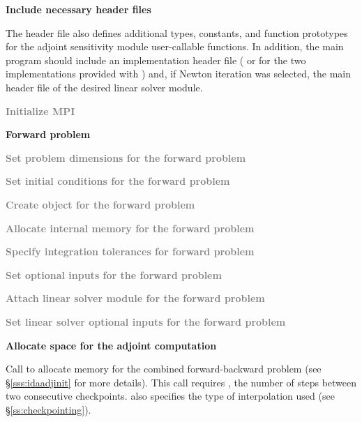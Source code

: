 \begin{Steps}

\item
  {\bf Include necessary header files}
  
  The  header file also defines additional types, constants, and
  function prototypes for the adjoint sensitivity module user-callable functions.
  In addition, the main program should include an {\nvector} 
  implementation header file ( or 
  for the two implementations provided with {\idas}) and, if Newton iteration 
  was selected, the main header file of the desired linear solver module.

\item
  \textcolor{gray}{\bf {\p} Initialize MPI}

  \vspace{0.2in}\centerline{\bf Forward problem}

\item
  \textcolor{gray}{\bf Set problem dimensions for the forward problem}

\item
  \textcolor{gray}{\bf Set initial conditions for the forward problem}

\item
  \textcolor{gray}{\bf Create {\idas} object for the forward problem}

\item
  \textcolor{gray}{\bf Allocate internal memory for the forward problem}

\item
  \textcolor{gray}{\bf Specify integration tolerances for forward problem}

\item
  \textcolor{gray}{\bf Set optional inputs for the forward problem}

\item
  \textcolor{gray}{\bf Attach linear solver module for the forward problem}

\item
  \textcolor{gray}{\bf Set linear solver optional inputs for the forward problem}

\item
  {\bf Allocate space for the adjoint computation}

  Call \id{()} to allocate memory for the 
  combined forward-backward problem (see \S\ref{sss:idaadjinit} for more details).
  This call requires , the number of steps between two consecutive checkpoints.
   also specifies the type of interpolation used 
  (see \S\ref{ss:checkpointing}).


\end{Steps}
